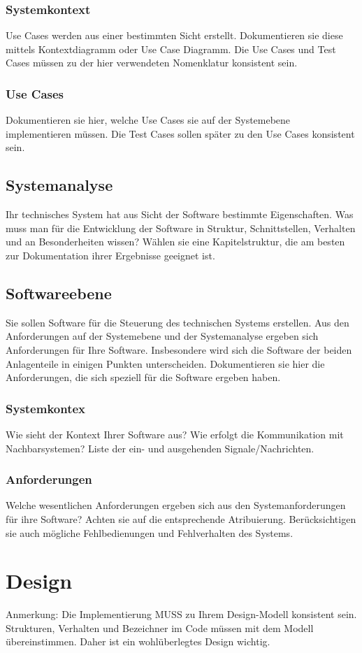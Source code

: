 \documentclass[
   draft=false
  ,paper=a4
  ,twoside=true
  ,fontsize=11pt
  ,headsepline
  ,DIV11
  ,parskip=full+
]{scrartcl} %
\begin{document}
\subsubsection{Systemkontext}
Use Cases werden aus einer bestimmten Sicht erstellt. Dokumentieren sie diese mittels Kontextdiagramm oder Use Case Diagramm. Die Use Cases und Test Cases müssen zu der hier verwendeten Nomenklatur konsistent sein.
\subsubsection{Use Cases}
Dokumentieren sie hier, welche Use Cases sie auf der Systemebene implementieren müssen. Die Test Cases sollen später zu den Use Cases konsistent sein.
\subsection{Systemanalyse}
Ihr technisches System hat aus Sicht der Software bestimmte Eigenschaften. Was muss man für die Entwicklung der Software in Struktur, Schnittstellen, Verhalten und an Besonderheiten wissen? Wählen sie eine Kapitelstruktur, die am besten zur Dokumentation ihrer Ergebnisse geeignet ist.
\subsection{Softwareebene}
Sie sollen Software für die Steuerung des technischen Systems erstellen. Aus den Anforderungen auf der Systemebene und der Systemanalyse ergeben sich Anforderungen für Ihre Software. Insbesondere wird sich die Software der beiden Anlagenteile in einigen Punkten unterscheiden. Dokumentieren sie hier die Anforderungen, die sich speziell für die Software ergeben haben.
\subsubsection{Systemkontex}
Wie sieht der Kontext Ihrer Software aus? Wie erfolgt die Kommunikation mit Nachbarsystemen? Liste der ein- und ausgehenden Signale/Nachrichten.
\subsubsection{Anforderungen}
Welche wesentlichen Anforderungen ergeben sich aus den Systemanforderungen für ihre Software? Achten sie auf die entsprechende Atribuierung. Berücksichtigen sie auch mögliche Fehlbedienungen und Fehlverhalten des Systems.
\newpage
\section{Design} 
Anmerkung: Die Implementierung MUSS zu Ihrem Design-Modell konsistent sein. Strukturen, Verhalten und Bezeichner im Code müssen mit dem Modell übereinstimmen. Daher ist ein wohlüberlegtes Design wichtig.
\end{document}
